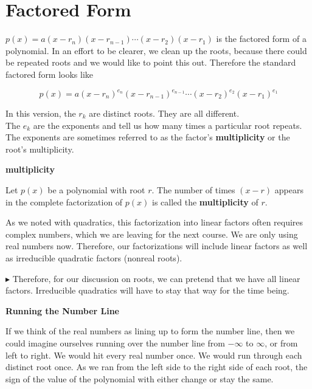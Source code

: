 \documentclass{ximera}
\begin{document}
\section{Factored Form}


$p(x) = a (x-r_n)(x-r_{n-1})  \cdots (x-r_2)(x-r_1)$ is the factored form of a polynomial.  In an effort to be clearer, we clean up the roots, because there could be repeated roots and we would like to point this out.  Therefore the standard factored form looks like




\[   p(x) = a (x-r_n)^{e_n} (x-r_{n-1})^{e_{n-1}}  \cdots (x-r_2)^{e_2} (x-r_1)^{e_1}  \]



In this version, the $r_k$ are distinct roots.  They are all different. \\
The $e_k$ are the exponents and tell us how many times a particular root repeats.  The exponents are sometimes referred to as the factor's \textbf{multiplicity} or the root's multiplicity.\\




\begin{definition} \textbf{\textcolor{green!50!black}{multiplicity}} 

Let $p(x)$ be a polynomial with root $r$.  The number of times $(x - r)$ appears in the complete factorization of $p(x)$ is called the \textbf{multiplicity} of $r$.

\end{definition}

As we noted with quadratics, this factorization into linear factors often requires complex numbers, which we are leaving for the next course. We are only using real numbers now.  Therefore, our factorizations will include linear factors as well as irreducible quadratic factors (nonreal roots).

\textbf{\textcolor{red!90!darkgray}{$\blacktriangleright$}}  Therefore, for our discussion on roots, we can pretend that we have all linear factors.  Irreducible quadratics will have to stay that way for the time being.










\textbf{\large Running the Number Line}

If we think of the real numbers as lining up to form the number line, then we could imagine ourselves running over the number line from $-\infty$ to $\infty$, or from left to right.  We would hit every real number once.  We would run through each distinct root once.  As we ran from the left side to the right side of each root, the sign of the value of the polynomial with either change or stay the same.
\end{document}
